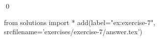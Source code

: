 
\begin{ex} 
  \label{ex:exercise-7}
  
  \qed
\end{ex} 
\begin{python0}
from solutions import *
add(label="ex:exercise-7",
    srcfilename='exercises/exercise-7/answer.tex') 
\end{python0}
